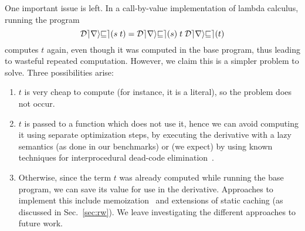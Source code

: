 \begin{oldSec} %
One important issue is left. In a call-by-value
implementation of lambda calculus, running the program
\[
\Derive{\App{s}{t}} = \App{\App{\Derive{s}}{t}}{\Derive{t}}
\]
computes $t$
again, even though it was computed in the base program, thus
leading to wasteful repeated computation.
However, we claim this is a simpler problem to solve.
Three possibilities arise:
\begin{enumerate}
\item $t$ is very cheap to compute (for instance, it is a
  literal), so the problem does not occur.
\item $t$ is passed to a function which does not use it, hence
  we can avoid computing it using separate optimization steps, by
  executing the derivative with a lazy semantics (as done in our
  benchmarks) or (we expect) by using known techniques for
  interprocedural dead-code elimination~\citep{Appel97}.
\item Otherwise, since the term $t$
  was already computed while running the base
  program, we can save its value for use in the derivative.
  Approaches to
  implement this include memoization~ and extensions of
  static caching (as discussed in Sec.~\ref{sec:rw}).
  We leave investigating the different
  approaches to future work.
\end{enumerate}
\end{oldSec}


